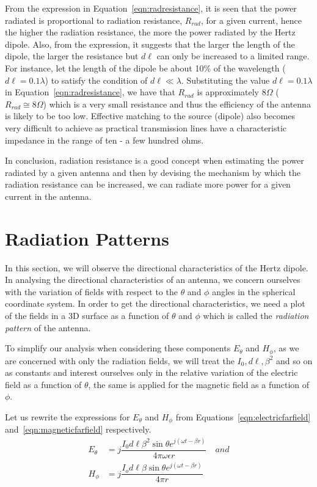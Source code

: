From the expression in Equation~\eqref{eqn:radresistance}, it is seen that the power radiated is proportional to radiation resistance, $R_{rad}$, for a given current, hence the higher the radiation resistance, the more the power radiated by the Hertz dipole. Also, from the expression, it suggests that the larger the length of the dipole, the larger the resistance but $d\ell$ can only be increased to a limited range. For instance, let the length of the dipole be about 10\%\; of the wavelength ($d\ell = 0.1\lambda$) to satisfy the condition of $d\ell \ll \lambda$. Substituting the value $d\ell = 0.1\lambda$ in Equation~\eqref{eqn:radresistance}, we have that $R_{rad}$ is approximately $8\Omega$ ($R_{rad} \cong 8\Omega$) which is a very small resistance and thus the efficiency of the antenna is likely to be too low. Effective matching to the source (dipole) also becomes very difficult to achieve as practical transmission lines have a characteristic impedance in the range of ten - a few hundred ohms.

In conclusion, radiation resistance is a good concept when estimating the power radiated by a given antenna and then by devising the mechanism by which the radiation resistance can be increased, we can radiate more power for a given current in the antenna. 

\section{Radiation Patterns}
In this section, we will observe the directional characteristics of the Hertz dipole. In analysing the directional characteristics of an antenna, we concern ourselves with the variation of fields with respect to the $\theta$ and $\phi$ angles in the spherical coordinate system. In order to get the directional characteristics, we need a plot of the fields in a 3D surface as a function of $\theta$ and $\phi$ which is called the \emph{radiation pattern} of the antenna. 

To simplify our analysis when considering these components $E_\theta$ and $H_\phi$, as we are concerned with only the radiation fields, we will treat the $I_0, d\ell, \beta^2$ and so on as constants and interest ourselves only in the relative variation of the electric field as a function of $\theta$, the same is applied for the magnetic field as a function of $\phi$.

Let us rewrite the expressions for $E_\theta$ and $H_\phi$ from Equations~\eqref{eqn:electricfarfield} and~\eqref{eqn:magneticfarfield} respectively.
\begin{align*}
E_\theta &= j\dfrac{I_0 d\ell\beta^2\sin\theta e^{j(\omega t - \beta r)}}{4\pi\omega\epsilon r} \quad and
\\
H_\phi &= j\dfrac{I_od\ell\beta\sin\theta e^{j(\omega t - \beta r)}}{4\pi r}
\end{align*}


